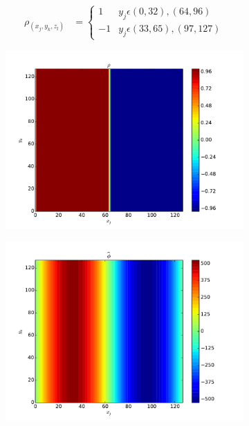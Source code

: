 	\begin{align}
		\rho_(x_j,y_k,z_l) &= \begin{cases} 1  & y_j \epsilon (0, 32), (64,96)\\ -1  & y_j \epsilon (33, 65), (97,127) \end{cases}
	\end{align}

	\begin{figure}
		\centering
			\begin{subfigure}[b]{0.32\textwidth}
				\includegraphics[width = \textwidth]{figures/verification/analytical/heaviside/rho.pdf}
			\end{subfigure}
			\begin{subfigure}[b]{0.32\textwidth}
				\includegraphics[width = \textwidth]{figures/verification/analytical/heaviside/numerical.pdf}

\end{subfigure}
\end{figure}
